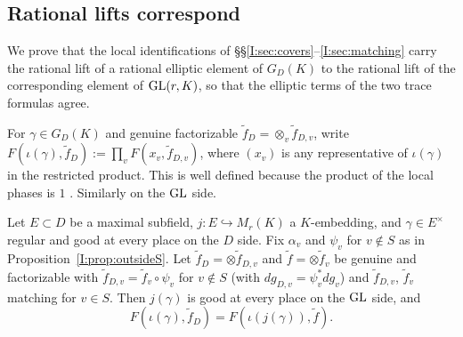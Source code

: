 \subsection{Rational lifts correspond}\label{I:subsec:rational}
We prove that the local identifications of \S\S\ref{I:sec:covers}--\ref{I:sec:matching} carry the rational lift of a rational elliptic element of $G_D(K)$ to the rational lift of the corresponding element of $\mathrm{GL}(r,K)$, so that the elliptic terms of the two trace formulas agree.

For $\gamma\in G_D(K)$ and genuine factorizable $\tilde f_D=\otimes_v\tilde f_{D,v}$, write $F(\iota(\gamma),\tilde f_D):=\prod_vF(x_v,\tilde f_{D,v})$, where $(x_v)$ is any representative of $\iota(\gamma)$ in the restricted product. This is well defined because the product of the local phases is $1$ \cite[Lemma~6.1, Remark~(3)]{JC26a}. Similarly on the $\mathrm{GL}$ side.

\begin{theorem}\label{I:thm:rational}
Let $E\subset D$ be a maximal subfield, $j:E\hookrightarrow M_r(K)$ a $K$-embedding, and $\gamma\in E^\times$ regular and good at every place on the $D$ side. Fix $\alpha_v$ and $\psi_v$ for $v\notin S$ as in Proposition~\ref{I:prop:outsideS}. Let $\tilde f_D=\otimes\tilde f_{D,v}$ and $\tilde f=\otimes\tilde f_v$ be genuine and factorizable with $\tilde f_{D,v}=\tilde f_v\circ\psi_v$ for $v\notin S$ (with $dg_{D,v}=\psi_v^*dg_v$) and $\tilde f_{D,v}$, $\tilde f_v$ matching for $v\in S$. Then $j(\gamma)$ is good at every place on the $\mathrm{GL}$ side, and
\[ F(\iota(\gamma),\tilde f_D)=F(\iota(j(\gamma)),\tilde f). \]
\end{theorem}

